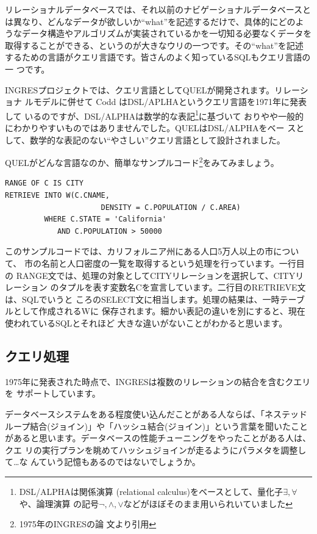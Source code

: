 リレーショナルデータベースでは、それ以前のナビゲーショナルデータベースと
は異なり、どんなデータが欲しいか``what''を記述するだけで、具体的にどのよ
うなデータ構造やアルゴリズムが実装されているかを一切知る必要なくデータを
取得することができる、というのが大きなウリの一つです。その``what''を記述
するための言語がクエリ言語です。皆さんのよく知っているSQLもクエリ言語の一
つです。


INGRESプロジェクトでは、クエリ言語としてQUELが開発されます。リレーショナ
ルモデルに併せて Codd はDSL/APLHAというクエリ言語を1971年に発表して
いるのですが、DSL/ALPHAは数学的な表記\footnote{DSL/ALPHAは関係演算
(relational calculus)をベースとして、量化子$\exists, \forall$や、論理演算
の記号$\lnot,\land,\lor$などがほぼそのまま用いられいていました}に基づいて
おりやや一般的にわかりやすいものではありませんでした。QUELはDSL/ALPHAをベー
スとして、数学的な表記のない``やさしい''クエリ言語として設計されました。


QUELがどんな言語なのか、簡単なサンプルコード\footnote{1975年のINGRESの論
文より引用}をみてみましょう。

\begin{center}
 \begin{minipage}{0.8\textwidth}
  \begin{lstlisting}
RANGE OF C IS CITY
RETRIEVE INTO W(C.CNAME,
                      DENSITY = C.POPULATION / C.AREA)
         WHERE C.STATE = 'California'
            AND C.POPULATION > 50000
  \end{lstlisting}
 \end{minipage}
\end{center}

このサンプルコードでは、カリフォルニア州にある人口5万人以上の市について、
市の名前と人口密度の一覧を取得するという処理を行っています。一行目の
RANGE文では、処理の対象としてCITYリレーションを選択して、CITYリレーション
のタプルを表す変数名Cを宣言しています。二行目のRETRIEVE文は、SQLでいうと
ころのSELECT文に相当します。処理の結果は、一時テーブルとして作成されるWに
保存されます。細かい表記の違いを別にすると、現在使われているSQLとそれほど
大きな違いがないことがわかると思います。


\subsection{クエリ処理}


1975年に発表された時点で、INGRESは複数のリレーションの結合を含むクエリを
サポートしています。


データベースシステムをある程度使い込んだことがある人ならば、「ネステッド
ループ結合(ジョイン)」や「ハッシュ結合(ジョイン)」という言葉を聞いたこと
があると思います。データベースの性能チューニングをやったことがある人は、クエ
リの実行プランを眺めてハッシュジョインが走るようにパラメタを調整して…な
んていう記憶もあるのではないでしょうか。


